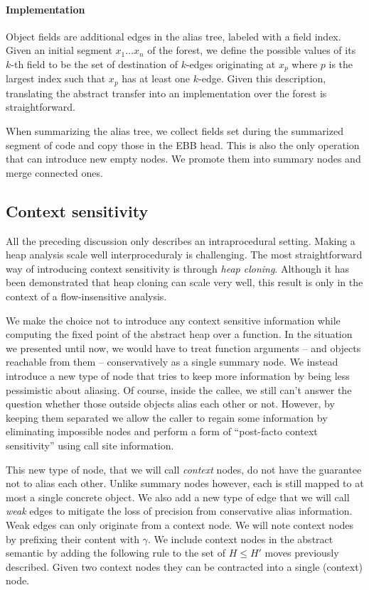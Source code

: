 \documentclass[11pt]{article}
\begin{document}
\paragraph{Implementation} Object fields are additional edges in the alias tree, labeled with a field index.
Given an initial segment $x_1\dots x_n$ of the forest, we define the possible values of its $k$-th field to be the set of destination of $k$-edges originating at $x_p$ where $p$ is the largest index such that $x_p$ has at least one $k$-edge.
Given this description, translating the abstract transfer into an implementation over the forest is straightforward.

When summarizing the alias tree, we collect fields set during the summarized segment of code and copy those in the EBB head.
This is also the only operation that can introduce new empty nodes. We promote them into summary nodes and merge connected ones.

\subsection*{Context sensitivity}

All the preceding discussion only describes an intraprocedural setting.
Making a heap analysis scale well interproceduraly is challenging.
The most straightforward way of introducing context sensitivity is through \emph{heap cloning}.
Although it has been demonstrated that heap cloning can scale very well\cite{heapclone}, this result is only in the context of a flow-insensitive analysis.

We make the choice not to introduce any context sensitive information while computing the fixed point of the abstract heap over a function.
In the situation we presented until now, we would have to treat function arguments -- and objects reachable from them -- conservatively as a single summary node.
We instead introduce a new type of node that tries to keep more information by being less pessimistic about aliasing.
Of course, inside the callee, we still can't answer the question whether those outside objects alias each other or not.
However, by keeping them separated we allow the caller to regain some information by eliminating impossible nodes and perform a form of ``post-facto context sensitivity'' using call site information.

This new type of node, that we will call \emph{context} nodes, do not have the guarantee not to alias each other.
Unlike summary nodes however, each is still mapped to at most a single concrete object.
We also add a new type of edge that we will call \emph{weak} edges to mitigate the loss of precision from conservative alias information.
Weak edges can only originate from a context node.
We will note context nodes by prefixing their content with $\gamma$.
We include context nodes in the abstract semantic by adding the following rule to the set of $H\leq H'$ moves previously described.
Given two context nodes they can be contracted into a single (context) node.
\end{document}
